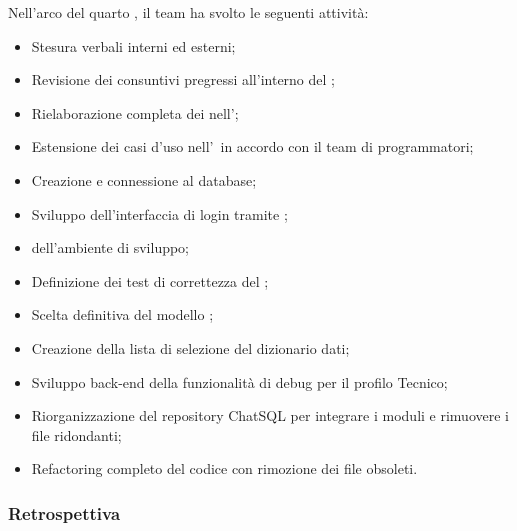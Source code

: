 Nell'arco del quarto , il team ha svolto le seguenti attività:
\begin{itemize}
    \item Stesura verbali interni ed esterni;
    \item Revisione dei consuntivi pregressi all'interno del \PdP;
    \item Rielaborazione completa dei  nell'\AdR;
    \item Estensione dei casi d'uso nell'\AdR\ in accordo con il team di programmatori;
    \item Creazione e connessione al database;
    \item Sviluppo dell'interfaccia di login tramite ;
    \item {} dell'ambiente di sviluppo;
    \item Definizione dei test di correttezza del ;
    \item Scelta definitiva del modello ;
    \item Creazione della lista di selezione del dizionario dati;
    \item Sviluppo back-end della funzionalità di debug per il profilo Tecnico;
    \item Riorganizzazione del repository ChatSQL per integrare i moduli e rimuovere i file ridondanti;
    \item Refactoring completo del codice con rimozione dei file obsoleti.
\end{itemize}

\subsubsection{Retrospettiva}

